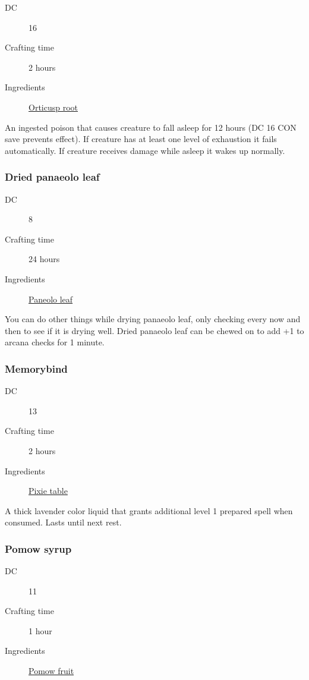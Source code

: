 \begin{description}
\item [DC] 16
\item [Crafting time] 2 hours
\item [Ingredients] \hyperref[Orticusp]{Orticusp root}
\end{description}

An ingested poison that causes creature to fall asleep for 12 hours (DC 16 CON save prevents effect). 
If creature has at least one level of exhaustion it fails automatically. 
If creature receives damage while asleep it wakes up normally.

\subsubsection{Dried panaeolo leaf}
\label{Dried panaeolo leaf}

\begin{description}
\item [DC] 8
\item [Crafting time] 24 hours
\item [Ingredients] \hyperref[Panaeolo]{Paneolo leaf}
\end{description}

You can do other things while drying panaeolo leaf, only checking every now and then to 
see if it is drying well. Dried panaeolo leaf can be chewed on to add +1 to arcana checks for 1 minute.

\subsubsection{Memorybind}
\label{Memorybind}

\begin{description}
\item [DC] 13
\item [Crafting time] 2 hours
\item [Ingredients] \hyperref[Pixie table]{Pixie table}
\end{description}

A thick lavender color liquid that grants additional level 1 prepared spell when consumed. Lasts until next rest.

\subsubsection{Pomow syrup}
\label{Pomow syrup}

\begin{description}
\item [DC] 11
\item [Crafting time] 1 hour
\item [Ingredients] \hyperref[Pomow]{Pomow fruit}
\end{description}

